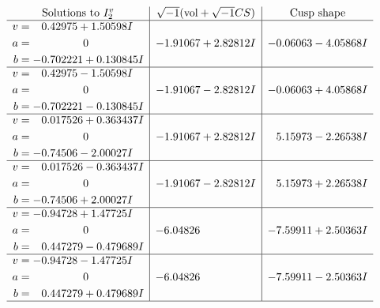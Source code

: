 \documentclass[1p]{elsarticle_modified}
\theoremstyle{definition}
\newcommand{\I}{\sqrt{-1}}
\begin{document}
$$\begin{array}{c|c|c}  
\text{Solutions to }I^v_{2}& \I (\text{vol} + \sqrt{-1}CS) & \text{Cusp shape}\\
 \hline 
\begin{aligned}
v &= \phantom{-}0.42975 + 1.50598 I \\
a &= \phantom{-0.000000 } 0 \\
b &= -0.702221 + 0.130845 I\end{aligned}
 & -1.91067 + 2.82812 I & -0.06063 - 4.05868 I \\ \hline\begin{aligned}
v &= \phantom{-}0.42975 - 1.50598 I \\
a &= \phantom{-0.000000 } 0 \\
b &= -0.702221 - 0.130845 I\end{aligned}
 & -1.91067 - 2.82812 I & -0.06063 + 4.05868 I \\ \hline\begin{aligned}
v &= \phantom{-}0.017526 + 0.363437 I \\
a &= \phantom{-0.000000 } 0 \\
b &= -0.74506 - 2.00027 I\end{aligned}
 & -1.91067 + 2.82812 I & \phantom{-}5.15973 - 2.26538 I \\ \hline\begin{aligned}
v &= \phantom{-}0.017526 - 0.363437 I \\
a &= \phantom{-0.000000 } 0 \\
b &= -0.74506 + 2.00027 I\end{aligned}
 & -1.91067 - 2.82812 I & \phantom{-}5.15973 + 2.26538 I \\ \hline\begin{aligned}
v &= -0.94728 + 1.47725 I \\
a &= \phantom{-0.000000 } 0 \\
b &= \phantom{-}0.447279 - 0.479689 I\end{aligned}
 & -6.04826\phantom{ +0.000000I} & -7.59911 + 2.50363 I \\ \hline\begin{aligned}
v &= -0.94728 - 1.47725 I \\
a &= \phantom{-0.000000 } 0 \\
b &= \phantom{-}0.447279 + 0.479689 I\end{aligned}
 & -6.04826\phantom{ +0.000000I} & -7.59911 - 2.50363 I\\
 \hline 
 \end{array}$$\newpage
\newpage\renewcommand{\arraystretch}{1}
\end{document}
